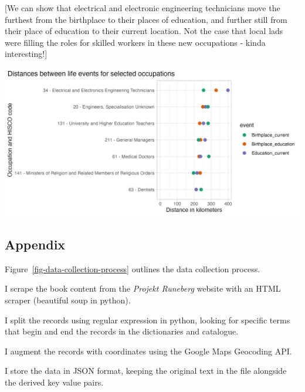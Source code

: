 \documentclass[
]{article}
\begin{document}
{[}We can show that electrical and electronic engineering technicians
move the furthest from the birthplace to their places of education, and
further still from their place of education to their current location.
Not the case that local lads were filling the roles for skilled workers
in these new occupations - kinda interesting!{]}

\includegraphics{assets/distances_comparison.png}

\hypertarget{appendix}{%
\subsection{Appendix}\label{appendix}}

Figure~\ref{fig-data-collection-process} outlines the data collection
process.

I scrape the book content from the \emph{Projekt Runeberg} website with
an HTML scraper (beautiful soup in python).

I split the records using regular expression in python, looking for
specific terms that begin and end the records in the dictionaries and
catalogue.

I augment the records with coordinates using the Google Maps Geocoding
API.

I store the data in JSON format, keeping the original text in the file
alongside the derived key value pairs.


\printbibliography[title=References]
\end{document}
